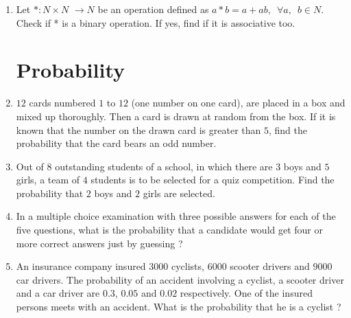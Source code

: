 \documentclass[12pt,-letter paper]{article}
\begin{document}
\begin{enumerate}
    \item Let $* : N \times N$ $\rightarrow N $ be an operation defined as $a * b = a + ab, \hspace{6pt}\forall a,\hspace{6pt}b \in N $. Check if * is a binary operation. If yes, find if it is associative too.


\section{Probability}
    \item $12$ cards numbered $1$ to $12$ (one number on one card), are placed in a box and mixed up thoroughly. Then a card is drawn at random from the box. If it is known that the number on the drawn card is greater than $5$, find the probability that the card bears an odd number.

    \item Out of $8$ outstanding students of a school, in which there are $3$ boys and $5$ girls, a team of $4$ students is to be selected for a quiz competition. Find the probability that $2$ boys and $2$ girls are selected.

    \item In a multiple choice examination with three possible answers for each of the five questions, what is the probability that a candidate would get four or more correct answers just by guessing ?

    \item An insurance company insured $3000$ cyclists,  $6000$ scooter drivers and $9000$ car drivers. The probability of an accident involving a cyclist, a scooter driver and a car driver are $0.3$, $0.05$ and $0.02$ respectively. One of the insured persons meets with an accident. What is the probability that he is a cyclist ?
    
\end{enumerate}
\end{document}
